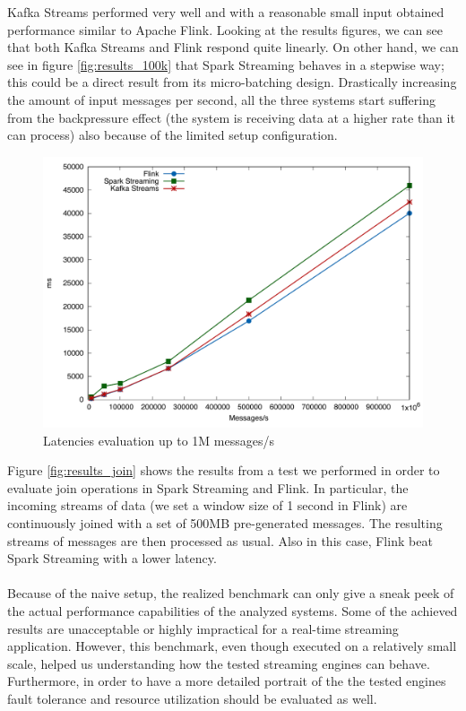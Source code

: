 Kafka Streams performed very well and with a reasonable small input obtained performance similar to Apache Flink. Looking at the results figures, we can see that both Kafka Streams and Flink respond quite linearly. On other hand, we can see in figure \ref{fig:results_100k} that Spark Streaming behaves in a stepwise way; this could be a direct result from its micro-batching design. Drastically increasing the amount of input messages per second, all the three systems start suffering from the backpressure effect (the system is receiving data at a higher rate than it can process) also because of the limited setup configuration.
 
 \begin{figure}[ht!]
\includegraphics[width=1\textwidth]{images/engines_1m_cropped.pdf}
 \caption{Latencies evaluation up to 1M messages/s}
\label{fig:results_1m}
\end{figure}

Figure \ref{fig:results_join} shows the results from a test we performed in order to evaluate join operations in Spark Streaming and Flink. In particular, the incoming streams of data (we set a window size of 1 second in Flink) are continuously joined with a set of 500MB pre-generated messages. The resulting streams of messages are then processed as usual. Also in this case, Flink beat Spark Streaming with a lower latency.
\paragraph{}
Because of the naive setup, the realized benchmark can only give a sneak peek of the actual performance capabilities of the analyzed systems. Some of the achieved results are unacceptable or highly impractical for a real-time streaming application. However, this benchmark, even though executed on a relatively small scale, helped us understanding how the tested streaming engines can behave. Furthermore, in order to have a more detailed portrait of the the tested engines fault tolerance and resource utilization should be evaluated as well. 
